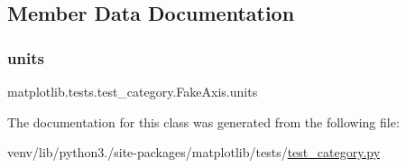 \subsection{Member Data Documentation}
\mbox{\label{classmatplotlib_1_1tests_1_1test__category_1_1FakeAxis_aa9d379b52b26c1f8083441f32958b9bf}} 
\subsubsection{\texorpdfstring{units}{units}}
{\footnotesize\ttfamily matplotlib.\+tests.\+test\+\_\+category.\+Fake\+Axis.\+units}



The documentation for this class was generated from the following file\+:\begin{DoxyCompactItemize}
\item 
venv/lib/python3./site-\/packages/matplotlib/tests/\hyperlink{test__category_8py}{test\+\_\+category.\+py}\end{DoxyCompactItemize}
